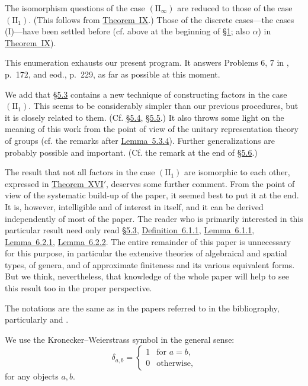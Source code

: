 \documentclass[b5paper,twoside]{article}
\newcommand{\secref}[2]{\hyperref[#1]{\mbox{\S#2}}}
\newcommand{\thmref}[2]{\hyperref[#1]{\mbox{Theorem~#2}}}
\newcommand{\lemref}[2]{\hyperref[#1]{\mbox{Lemma~#2}}}
\newcommand{\defref}[2]{\hyperref[#1]{\mbox{Definition~#2}}}
\theoremstyle{mvnplain}
\begin{document}
The isomorphism questions of the case $(\mathrm{II}_\infty)$ are reduced to
those of the case $(\mathrm{II}_1)$. (This follows from
\thmref{thm:IX}{IX}.) Those of the discrete cases---the cases (I)---have been
settled before (cf. above at the beginning of \hyperref[intro:1]{\S1}; also
$\alpha$) in \thmref{thm:IX}{IX}).

This enumeration exhausts our present program. It answers Problems 6, 7 in
\cite{ref5}, p.~172, and \cite{ref5} eod., p.~229, as far as possible at this
moment.

We add that \secref{sec:5.3}{5.3} contains a new technique of constructing
factors in the case $(\mathrm{II}_1)$. This seems to be considerably simpler
than our previous procedures, but it is closely related to them. (Cf.
\secref{sec:5.4}{5.4}, \secref{sec:5.5}{5.5}.) It also throws some light on
the meaning of this work from the point of view of the unitary representation
theory of groups (cf. the remarks after \lemref{lem:5.3.4}{5.3.4}). Further
generalizations are probably possible and important. (Cf. the remark at the
end of \secref{sec:5.6}{5.6}.)

The result that not all factors in the case $(\mathrm{II}_1)$ are isomorphic
to each other, expressed in \thmref{thm:XVI-prime}{XVI$'$}, deserves some
further comment. From the point of view of the systematic build-up of the
paper, it seemed best to put it at the end. It is, however, intelligible and of
interest in itself, and it can be derived independently of most of the paper.
The reader who is primarily interested in this particular result need only
read \secref{sec:5.3}{5.3}, \defref{def:6.1.1}{6.1.1},
\lemref{lem:6.1.1}{6.1.1}, \lemref{lem:6.2.1}{6.2.1},
\lemref{lem:6.2.2}{6.2.2}. The entire remainder of this paper is unnecessary
for this purpose, in particular the extensive theories of algebraical and
spatial types, of genera, and of approximate finiteness and its various
equivalent forms. But we think, nevertheless, that knowledge of the whole
paper will help to see this result too in the proper perspective.

The notations are the same as in the papers referred to in the bibliography,
particularly \cite{ref5} and \cite{ref6}.

We use the Kronecker--Weierstrass symbol in the general sense:
\[
  \delta_{a,b}=
  \begin{cases}
    1&\text{for }a=b,\\
    0&\text{otherwise},
  \end{cases}
\]
for any objects $a,b$.
\end{document}
